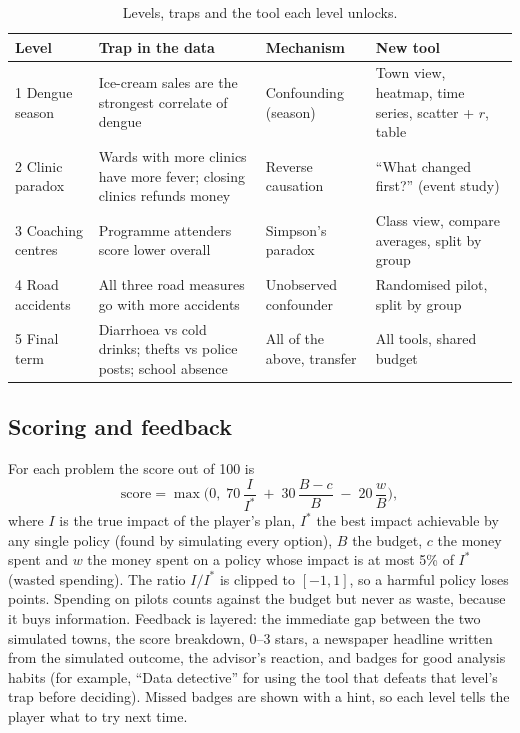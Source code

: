 \documentclass[11pt,a4paper]{article}
\begin{document}
\begin{table}[H]
\centering\small
\caption{Levels, traps and the tool each level unlocks.}
\label{tab:levels}
\begin{tabularx}{\textwidth}{@{}P{2.4cm}LLP{3.4cm}@{}}
\toprule
Level & Trap in the data & Mechanism & New tool \\
 Dengue season & Ice-cream sales are the strongest correlate of dengue & Confounding (season) & Town view, heatmap, time series, scatter + $r$, table \\
2 Clinic paradox & Wards with more clinics have more fever; closing clinics refunds money & Reverse causation & ``What changed first?'' (event study) \\
3 Coaching centres & Programme attenders score lower overall & Simpson's paradox & Class view, compare averages, split by group \\
4 Road accidents & All three road measures go with more accidents & Unobserved confounder & Randomised pilot, split by group \\
5 Final term & Diarrhoea vs cold drinks; thefts vs police posts; school absence & All of the above, transfer & All tools, shared budget \\
\bottomrule
\end{tabularx}
\end{table}

\subsection{Scoring and feedback}
For each problem the score out of 100 is
\begin{equation}
\text{score} = \max\!\Big(0,\; 70\,\frac{I}{I^{*}} \;+\; 30\,\frac{B - c}{B} \;-\; 20\,\frac{w}{B}\Big),
\end{equation}
where $I$ is the true impact of the player's plan, $I^{*}$ the best impact achievable by any single policy (found by
simulating every option), $B$ the budget, $c$ the money spent and $w$ the money spent on a policy whose impact is at most
5\% of $I^{*}$ (wasted spending). The ratio $I/I^{*}$ is clipped to $[-1,1]$, so a harmful policy loses points. Spending on
pilots counts against the budget but never as waste, because it buys information. Feedback is layered: the immediate gap
between the two simulated towns, the score breakdown, 0--3 stars, a newspaper headline written from the simulated outcome,
the advisor's reaction, and badges for good analysis habits (for example, ``Data detective'' for using the tool that
defeats that level's trap before deciding). Missed badges are shown with a hint, so each level tells the player what to try next time.
\end{document}
